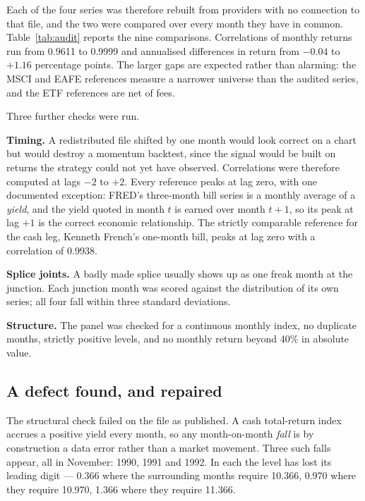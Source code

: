 \documentclass[11pt,a4paper]{article}
\let\oldsubsection\subsection
\renewcommand{\subsection}{\FloatBarrier\oldsubsection}
\begin{document}
\begin{table}[!ht]
  \centering
  \caption{The dataset against independent sources.}
  \label{tab:audit}
  
\end{table}

Each of the four series was therefore rebuilt from providers with no connection
to that file, and the two were compared over every month they have in common.
Table~\ref{tab:audit} reports the nine comparisons. Correlations of monthly
returns run from 0.9611 to 0.9999 and annualised differences in return from
$-0.04$ to $+1.16$ percentage points. The larger gaps are expected rather than
alarming: the MSCI and EAFE references measure a narrower universe than the
audited series, and the ETF references are net of fees.

Three further checks were run.

\textbf{Timing.} A redistributed file shifted by one month would look correct
on a chart but would destroy a momentum backtest, since the signal would be
built on returns the strategy could not yet have observed. Correlations were
therefore computed at lags $-2$ to $+2$. Every reference peaks at lag zero,
with one documented exception: FRED's three-month bill series is a monthly
average of a \emph{yield}, and the yield quoted in month $t$ is earned over
month $t+1$, so its peak at lag $+1$ is the correct economic relationship. The
strictly comparable reference for the cash leg, Kenneth French's one-month
bill, peaks at lag zero with a correlation of 0.9938.

\textbf{Splice joints.} A badly made splice usually shows up as one freak month
at the junction. Each junction month was scored against the distribution of its
own series; all four fall within three standard deviations.

\textbf{Structure.} The panel was checked for a continuous monthly index, no
duplicate months, strictly positive levels, and no monthly return beyond 40\%
in absolute value.

\subsection*{A defect found, and repaired}

The structural check failed on the file as published. A cash total-return index
accrues a positive yield every month, so any month-on-month \emph{fall} is by
construction a data error rather than a market movement. Three such falls
appear, all in November: 1990, 1991 and 1992. In each the level has lost its
leading digit --- 0.366 where the surrounding months require 10.366, 0.970
where they require 10.970, 1.366 where they require 11.366.
\end{document}
